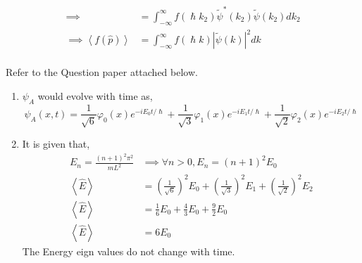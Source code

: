 \documentclass[addpoints]{exam}
\begin{document}
\begin{questions}
\begin{solution}
\begin{enumerate}
\begin{equation*}
\begin{aligned}
                          \implies                         & = \int_{-\infty}^{\infty} f(\hslash k_2) \tilde{\psi}^*(k_2) \tilde{\psi}(k_2) dk_2                                                                                                                                                                                        \\
                          \implies \left<f(\hat{p})\right> & = \int_{-\infty}^{\infty} f(\hslash k) \left|\tilde{\psi}(k)\right|^2 dk                                                                                                                                                                                                   \\
                      \end{aligned}
                  \end{equation*}
        \end{enumerate}
    \end{solution}
    \pagebreak
    \question[15] Refer to the Question paper attached below.
    \begin{solution}
        \begin{enumerate}
            \item \(\psi_A\) would evolve with time as,
                  \[\psi_A(x,t) = \frac{1}{\sqrt{6}}\varphi_0(x)e^{-iE_0t/\hslash}+\frac{1}{\sqrt{3}}\varphi_1(x)e^{-iE_1t/\hslash}+\frac{1}{\sqrt{2}}\varphi_2(x)e^{-iE_2t/\hslash}\]
            \item It is given that,
                  \begin{equation*}
                      \begin{aligned}
                          E_n = \frac{(n+1)^2\pi^2}{mL^2} & \implies \forall n > 0, E_n = (n+1)^2E_0                                                                         \\
                          \left<\hat{E}\right>            & = \left(\frac{1}{\sqrt{6}}\right)^2E_0+\left(\frac{1}{\sqrt{3}}\right)^2E_1+\left(\frac{1}{\sqrt{2}}\right)^2E_2 \\
                          \left<\hat{E}\right>            & = \frac{1}{6}E_0+\frac{4}{3}E_0+\frac{9}{2}E_0                                                                   \\
                          \left<\hat{E}\right>            & = 6E_0
                      \end{aligned}
                  \end{equation*}
                  The Energy eign values do not change with time.

\end{enumerate}
\end{solution}
\end{questions}
\end{document}
